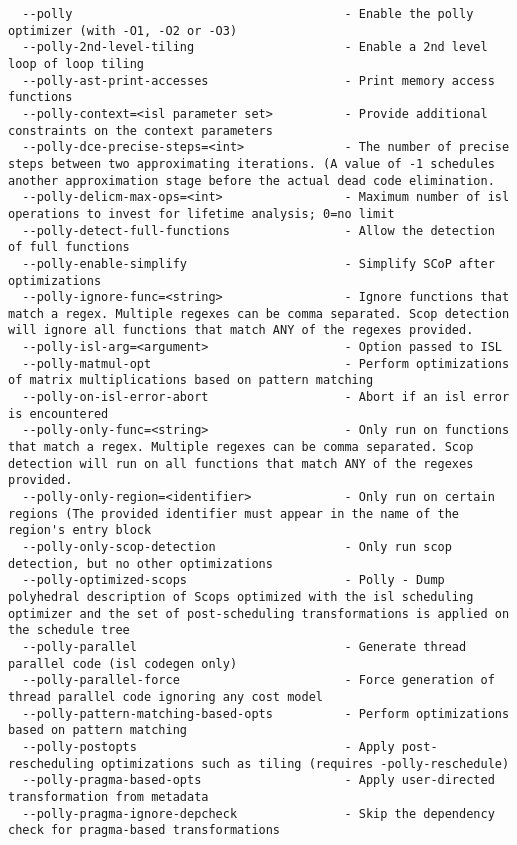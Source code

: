 \documentclass{studrep}
\begin{document}
\begin{verbatim}
  --polly                                      - Enable the polly optimizer (with -O1, -O2 or -O3)
  --polly-2nd-level-tiling                     - Enable a 2nd level loop of loop tiling
  --polly-ast-print-accesses                   - Print memory access functions
  --polly-context=<isl parameter set>          - Provide additional constraints on the context parameters
  --polly-dce-precise-steps=<int>              - The number of precise steps between two approximating iterations. (A value of -1 schedules another approximation stage before the actual dead code elimination.
  --polly-delicm-max-ops=<int>                 - Maximum number of isl operations to invest for lifetime analysis; 0=no limit
  --polly-detect-full-functions                - Allow the detection of full functions
  --polly-enable-simplify                      - Simplify SCoP after optimizations
  --polly-ignore-func=<string>                 - Ignore functions that match a regex. Multiple regexes can be comma separated. Scop detection will ignore all functions that match ANY of the regexes provided.
  --polly-isl-arg=<argument>                   - Option passed to ISL
  --polly-matmul-opt                           - Perform optimizations of matrix multiplications based on pattern matching
  --polly-on-isl-error-abort                   - Abort if an isl error is encountered
  --polly-only-func=<string>                   - Only run on functions that match a regex. Multiple regexes can be comma separated. Scop detection will run on all functions that match ANY of the regexes provided.
  --polly-only-region=<identifier>             - Only run on certain regions (The provided identifier must appear in the name of the region's entry block
  --polly-only-scop-detection                  - Only run scop detection, but no other optimizations
  --polly-optimized-scops                      - Polly - Dump polyhedral description of Scops optimized with the isl scheduling optimizer and the set of post-scheduling transformations is applied on the schedule tree
  --polly-parallel                             - Generate thread parallel code (isl codegen only)
  --polly-parallel-force                       - Force generation of thread parallel code ignoring any cost model
  --polly-pattern-matching-based-opts          - Perform optimizations based on pattern matching
  --polly-postopts                             - Apply post-rescheduling optimizations such as tiling (requires -polly-reschedule)
  --polly-pragma-based-opts                    - Apply user-directed transformation from metadata
  --polly-pragma-ignore-depcheck               - Skip the dependency check for pragma-based transformations

\end{verbatim}
\end{document}
